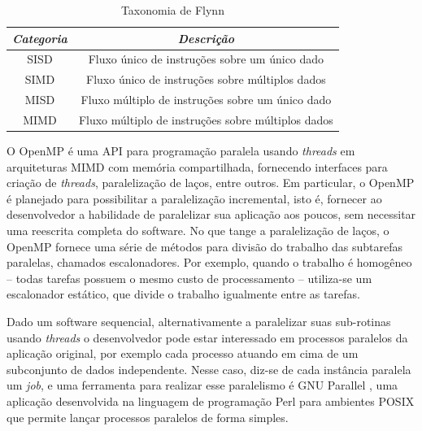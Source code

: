 \documentclass[cic,tc]{iiufrgs}
\begin{document}
\begin{table}[h]
    \caption{Taxonomia de Flynn}
    \centering
        \begin{tabular}{c|c}
          \hline
          \textit{Categoria}  &   \textit{Descrição} \\
          \hline
          \hline
          SISD & Fluxo único de instruções sobre um único dado \\
          SIMD & Fluxo único de instruções sobre múltiplos dados \\
          MISD & Fluxo múltiplo de instruções sobre um único dado \\
          MIMD & Fluxo múltiplo de instruções sobre múltiplos dados \\
          \hline
        \end{tabular}
    \label{tbl:flynn}
\end{table}

O OpenMP \cite{chandra2001parallel} é uma API para programação paralela usando \textit{threads} em
arquiteturas MIMD com memória compartilhada, fornecendo interfaces para criação
de \textit{threads}, paralelização de laços, entre outros. Em particular, o
OpenMP é planejado para possibilitar a paralelização incremental, isto é,
fornecer ao desenvolvedor a habilidade de paralelizar sua aplicação aos poucos,
sem necessitar uma reescrita completa do software. No que tange a
paralelização de laços, o OpenMP fornece uma série de métodos para divisão do
trabalho das subtarefas paralelas, chamados escalonadores. Por exemplo, quando
o trabalho é homogêneo -- todas tarefas possuem o mesmo custo de processamento
-- utiliza-se um escalonador estático, que divide o trabalho igualmente entre
as tarefas.

Dado um software sequencial, alternativamente a paralelizar suas
sub-rotinas usando \textit{threads} o desenvolvedor pode estar interessado em
processos paralelos da aplicação original, por exemplo cada processo atuando
em cima de um subconjunto de dados independente. Nesse caso, diz-se de cada
instância paralela um \textit{job}, e uma ferramenta para realizar esse
paralelismo é GNU Parallel \cite{tange_ole_2021_5233953}, uma aplicação
desenvolvida na linguagem de programação Perl para ambientes POSIX que permite
lançar processos paralelos de forma simples.
\end{document}
